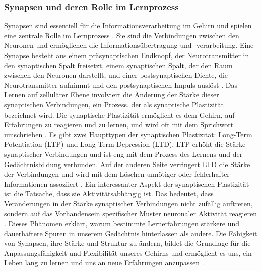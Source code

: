 \subsubsection{Synapsen und deren Rolle im Lernprozess}
Synapsen sind essentiell für die Informationsverarbeitung im Gehirn und spielen eine zentrale Rolle im Lernprozess \cite{Kandel2012}. Sie sind die Verbindungen zwischen den Neuronen und ermöglichen die Informationsübertragung und -verarbeitung. Eine Synapse besteht aus einem präsynaptischen Endknopf, der Neurotransmitter in den synaptischen Spalt freisetzt, einem synaptischen Spalt, der den Raum zwischen den Neuronen darstellt, und einer postsynaptischen Dichte, die Neurotransmitter aufnimmt und den postsynaptischen Impuls auslöst \cite{Bear2015}.\newline
Das Lernen auf zellulärer Ebene involviert die Änderung der Stärke dieser synaptischen Verbindungen, ein Prozess, der als synaptische Plastizität bezeichnet wird. Die synaptische Plastizität ermöglicht es dem Gehirn, auf Erfahrungen zu reagieren und zu lernen, und wird oft mit dem Sprichwort  umschrieben \cite{Hebb1949}. \newline
Es gibt zwei Haupttypen der synaptischen Plastizität: Long-Term Potentiation (LTP) und Long-Term Depression (LTD). LTP erhöht die Stärke synaptischer Verbindungen und ist eng mit dem Prozess des Lernens und der Gedächtnisbildung verbunden. Auf der anderen Seite verringert LTD die Stärke der Verbindungen und wird mit dem Löschen unnötiger oder fehlerhafter Informationen assoziiert \cite{Cooke2006}. \newline
Ein interessanter Aspekt der synaptischen Plastizität ist die Tatsache, dass sie Aktivitätsabhängig ist. Das bedeutet, dass Veränderungen in der Stärke synaptischer Verbindungen nicht zufällig auftreten, sondern auf das Vorhandensein spezifischer Muster neuronaler Aktivität reagieren \cite{Kandel2012}. Dieses Phänomen erklärt, warum bestimmte Lernerfahrungen stärkere und dauerhaftere Spuren in unserem Gedächtnis hinterlassen als andere. \newline
Die Fähigkeit von Synapsen, ihre Stärke und Struktur zu ändern, bildet die Grundlage für die Anpassungsfähigkeit und Flexibilität unseres Gehirns und ermöglicht es uns, ein Leben lang zu lernen und uns an neue Erfahrungen anzupassen \cite{Bear2015}. \newline

